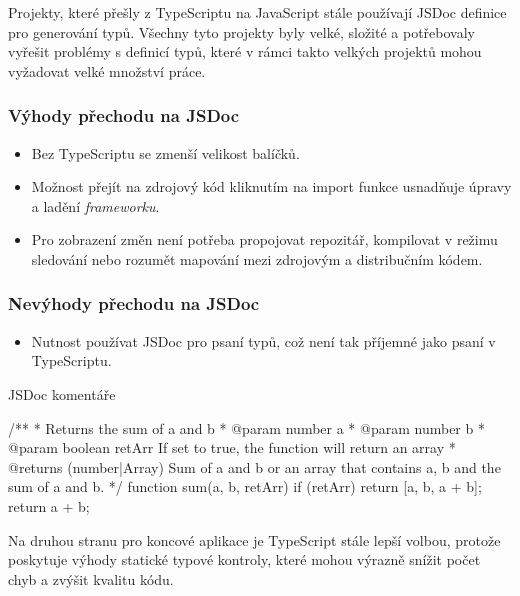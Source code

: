 Projekty, které přešly z TypeScriptu na JavaScript stále používají JSDoc definice pro generování typů. Všechny tyto projekty byly velké, složité a potřebovaly vyřešit problémy s definicí typů, které v rámci takto velkých projektů mohou vyžadovat velké množství práce. \cite{DitchingTypescript}

\subsubsection{Výhody přechodu na JSDoc}

\begin{itemize}
    \item Bez TypeScriptu se zmenší velikost balíčků.
    \item Možnost přejít na zdrojový kód kliknutím na import funkce usnadňuje úpravy a ladění \emph{frameworku}.
    \item Pro zobrazení změn není potřeba propojovat repozitář, kompilovat v režimu sledování nebo rozumět mapování mezi zdrojovým a distribučním kódem.
\end{itemize}

\subsubsection{Nevýhody přechodu na JSDoc}

\begin{itemize}
    \item Nutnost používat JSDoc pro psaní typů, což není tak příjemné jako psaní v TypeScriptu.
\end{itemize}

\begin{listing}[H]
    \caption{JSDoc komentáře \cite{JSDocExample}}
    \label{lst:jsdoc-example}
    \begin{code}[js]
/**
* Returns the sum of a and b
* @param {number} a
* @param {number} b
* @param {boolean} retArr If set to true, the function will return an array
* @returns {(number|Array)} Sum of a and b or an array that contains a, b and the sum of a and b.
*/
function sum(a, b, retArr) {
    if (retArr) {
        return [a, b, a + b];
    }
    return a + b;
}
    \end{code}
\end{listing}

Na druhou stranu pro koncové aplikace je TypeScript stále lepší volbou, protože poskytuje výhody statické typové kontroly, které mohou výrazně snížit počet chyb a zvýšit kvalitu kódu. \cite{FireshipTypescript}

